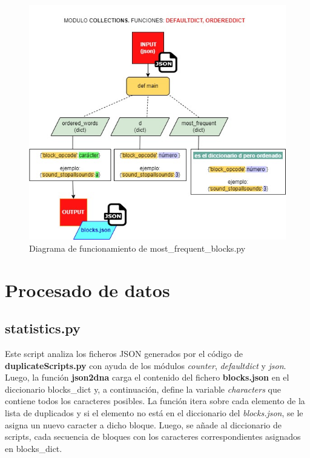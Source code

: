 \documentclass[a4paper, 12pt]{book}
\begin{document}
\begin{figure}[!htb]
  \centering
  \includegraphics[width=14cm, keepaspectratio]{img/flow_mostfreq.jpg}
  \caption{Diagrama de funcionamiento de most\_frequent\_blocks.py}
  \label{fig:flow_mostfreq}
\end{figure}

\newpage 

\section{Procesado de datos} 
\label{sec:procesadodatos}

\subsection{statistics.py}

Este script analiza los ficheros JSON generados por el código de \textbf{duplicateScripts.py} con ayuda de los módulos \textit{counter}, \textit{defaultdict} y \textit{json}. Luego, la función \textbf{json2dna} carga el contenido del fichero \textbf{blocks.json} en el diccionario blocks\_dict y, a continuación, define la variable \textit{characters} que contiene todos los caracteres posibles. La función itera sobre cada elemento de la lista de duplicados y si el elemento no está en el diccionario del \textit{blocks.json}, se le asigna un nuevo caracter a dicho bloque. Luego, se añade al diccionario de scripts, cada secuencia de bloques con los caracteres correspondientes asignados en blocks\_dict.
\end{document}
